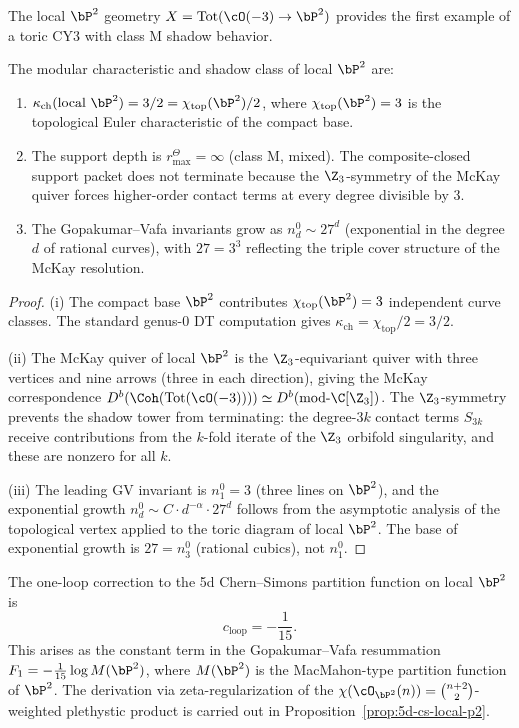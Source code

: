 The local $\bP^2$ geometry $X = \mathrm{Tot}(\cO(-3) \to \bP^2)$ provides the first example of a toric CY3 with class M shadow behavior.

\begin{theorem}
\label{thm:local-p2-shadow}
The modular characteristic and shadow class of local $\bP^2$ are:
\begin{enumerate}[label=(\roman*)]
 \item $\kappa_{\mathrm{ch}}(\text{local } \bP^2) = 3/2 = \chi_{\mathrm{top}}(\bP^2)/2$, where $\chi_{\mathrm{top}}(\bP^2) = 3$ is the topological Euler characteristic of the compact base.
 \item The support depth is \(r^\Theta_{\max}=\infty\) (class M, mixed). The composite-closed support packet does not terminate because the $\Z_3$-symmetry of the McKay quiver forces higher-order contact terms at every degree divisible by $3$.
 \item The Gopakumar--Vafa invariants grow as $n_d^0 \sim 27^d$ (exponential in the degree $d$ of rational curves), with $27 = 3^3$ reflecting the triple cover structure of the McKay resolution.
\end{enumerate}
\end{theorem}

\begin{proof}
(i) The compact base $\bP^2$ contributes $\chi_{\mathrm{top}}(\bP^2) = 3$ independent curve classes. The standard genus-$0$ DT computation gives $\kappa_{\mathrm{ch}} = \chi_{\mathrm{top}}/2 = 3/2$.

(ii) The McKay quiver of local $\bP^2$ is the $\Z_3$-equivariant quiver with three vertices and nine arrows (three in each direction), giving the McKay correspondence $D^b(\Coh(\mathrm{Tot}(\cO(-3)))) \simeq D^b(\mathrm{mod}\text{-}\C[\Z_3])$. The $\Z_3$-symmetry prevents the shadow tower from terminating: the degree-$3k$ contact terms $S_{3k}$ receive contributions from the $k$-fold iterate of the $\Z_3$ orbifold singularity, and these are nonzero for all $k$.

(iii) The leading GV invariant is $n_1^0 = 3$ (three lines on $\bP^2$), and the exponential growth $n_d^0 \sim C \cdot d^{-\alpha} \cdot 27^d$ follows from the asymptotic analysis of the topological vertex applied to the toric diagram of local $\bP^2$. The base of exponential growth is $27 = n_3^0$ (rational cubics), not $n_1^0$.
\end{proof}

\begin{proposition}
\label{prop:local-p2-loop}
The one-loop correction to the 5d Chern--Simons partition function on local $\bP^2$ is
\[
 c_{\mathrm{loop}} = -\frac{1}{15}.
\]
This arises as the constant term in the Gopakumar--Vafa resummation $F_1 = -\frac{1}{15} \log M(\bP^2)$, where $M(\bP^2)$ is the MacMahon-type partition function of $\bP^2$. The derivation via zeta-regularization of the $\chi(\cO_{\bP^2}(n)) = \binom{n+2}{2}$-weighted plethystic product is carried out in Proposition~\ref{prop:5d-cs-local-p2}.
\end{proposition}

